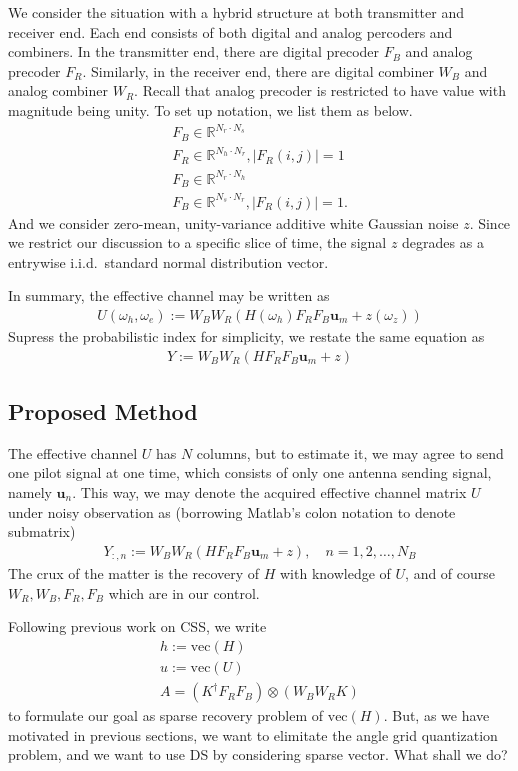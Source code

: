 \documentclass[12pt]{article}
\begin{document}
We consider the situation with a hybrid structure at both transmitter and receiver end.
Each end consists of both digital and analog percoders and combiners.
In the transmitter end, there are digital precoder \(F_B\) and analog precoder \(F_R\).
Similarly, in the receiver end, there are digital combiner \(W_B\) and analog combiner \(W_R\).
Recall that analog precoder is restricted to have value with magnitude being unity.
To set up notation, we list them as below.
\begin{gather}
F_B \in \mathbb{R}^{N_r \cdot N_s} \\
F_R \in \mathbb{R}^{N_h \cdot N_r}, |F_R(i,j)| =1 \\
F_B \in \mathbb{R}^{N_r \cdot N_h} \\
F_B \in \mathbb{R}^{N_s \cdot N_r}, |F_R(i,j)| =1.
\end{gather}
And we consider zero-mean, unity-variance additive white Gaussian noise \(z\).
Since we restrict our discussion to a specific slice of time, the signal \(z\) degrades as a entrywise i.i.d.\ standard normal distribution vector.

In summary, the effective channel may be written as
\begin{gather}
U (\omega_h, \omega_e)
:=W_B W_R ( H(\omega_h) F_R F_B \mathbf{u}_m +z(\omega_z) )
\end{gather}
Supress the probabilistic index for simplicity, we restate the same equation as
\begin{gather}
Y
:=W_B W_R ( H F_R F_B \mathbf{u}_m +z )
\end{gather}

\subsection{Proposed Method}

The effective channel \(U\) has \(N\) columns, but to estimate it, we may agree to send one pilot signal at one time, which consists of only one antenna sending signal, namely \(\mathbf{u}_n\).
This way, we may denote the acquired effective channel matrix \(U\) under noisy observation as (borrowing Matlab's colon notation to denote submatrix)
\begin{gather}
Y_{:,n}
:=W_B W_R ( H F_R F_B \mathbf{u}_m +z ), \quad
n =1, 2, \dotsc, N_B
\end{gather}
The crux of the matter is the recovery of \(H\) with knowledge of \(U\), and of course \(W_R, W_B, F_R, F_B\) which are in our control.

Following previous work on CSS, we write
\begin{gather}
h := \mathrm{vec}(H) \\
u := \mathrm{vec}(U) \\
A =(K^\dagger F_R F_B) \otimes (W_B W_R K)
\end{gather}
to formulate our goal as sparse recovery problem of \(\mathrm{vec}(H)\).
But, as we have motivated in previous sections, we want to elimitate the angle grid quantization problem, and we want to use DS by considering sparse vector.
What shall we do?
\end{document}
